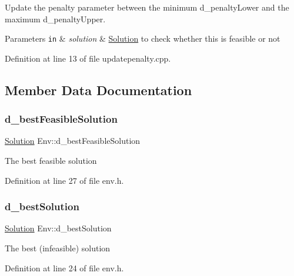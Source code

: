 Update the penalty parameter between the minimum d\+\_\+penalty\+Lower and the maximum d\+\_\+penalty\+Upper. 


\begin{DoxyParams}[1]{Parameters}
\mbox{\tt in}  & {\em solution} & \hyperlink{class_solution}{Solution} to check whether this is feasible or not \\
\hline
\end{DoxyParams}


Definition at line 13 of file updatepenalty.\+cpp.



\subsection{Member Data Documentation}
\mbox{\label{class_env_a639c27f323c898cb9821f4c64b1a055a}} 
\subsubsection{\texorpdfstring{d\+\_\+best\+Feasible\+Solution}{d\_bestFeasibleSolution}}
{\footnotesize\ttfamily \hyperlink{class_solution}{Solution} Env\+::d\+\_\+best\+Feasible\+Solution}

The best feasible solution 

Definition at line 27 of file env.\+h.

\mbox{\label{class_env_a200b43f8ef6487fd256326a549616e78}} 
\subsubsection{\texorpdfstring{d\+\_\+best\+Solution}{d\_bestSolution}}
{\footnotesize\ttfamily \hyperlink{class_solution}{Solution} Env\+::d\+\_\+best\+Solution}

The best (infeasible) solution 

Definition at line 24 of file env.\+h.

\mbox{\label{class_env_a60f53202173a69954e643ef46f16062f}} 
